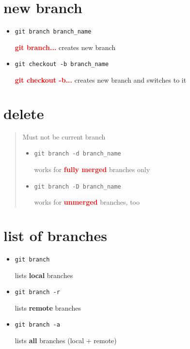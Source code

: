 \documentclass{report}
\begin{document}
\section{new branch}
\begin{itemize}

\item \begin{verbatim}
git branch branch_name
\end{verbatim}
\textcolor{red}{\textbf{git branch...}} creates new branch

\item \begin{verbatim}
git checkout -b branch_name
\end{verbatim}
\textcolor{red}{\textbf{git checkout -b...}} creates new branch and switches to it
 
\end{itemize}

\section{delete}
\begin{quote}
Must not be current branch
\begin{itemize}
\item \begin{verbatim}
git branch -d branch_name
\end{verbatim}
works for \textcolor{red}{\textbf{fully merged}} branches only

\item \begin{verbatim}
git branch -D branch_name
\end{verbatim}
works for \textcolor{red}{\textbf{unmerged}} branches, too
\end{itemize}

\end{quote}


\section{list of branches}
\begin{itemize}
\item \begin{verbatim}
git branch
\end{verbatim}
lists \textbf{local} branches

\item \begin{verbatim}
git branch -r
\end{verbatim}
lists \textbf{remote} branches

\item \begin{verbatim}
git branch -a
\end{verbatim}
lists \textbf{all} branches (local + remote)
\end{itemize}
\end{document}
